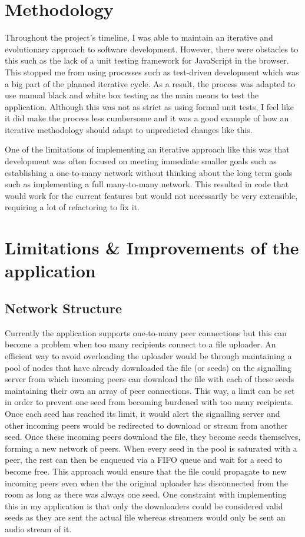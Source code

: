 \documentclass[]{report}
\begin{document}
		\section{Methodology}
		Throughout the project's timeline, I was able to maintain an iterative and evolutionary approach to software development. However, there were obstacles to this such as the lack of a unit testing framework for JavaScript in the browser. This stopped me from using processes such as test-driven development which was a big part of the planned iterative cycle. As a result, the process was adapted to use manual black and white box testing as the main means to test the application. Although this was not as strict as using formal unit tests, I feel like it did make the process less cumbersome and it was a good example of how an iterative methodology should adapt to unpredicted changes like this.
		
		One of the limitations of implementing an iterative approach like this was that development was often focused on meeting immediate smaller goals such as establishing a one-to-many network without thinking about the long term goals such as implementing a full many-to-many network. This resulted in code that would work for the current features but would not necessarily be very extensible, requiring a lot of refactoring to fix it.
	
		\section{Limitations \& Improvements of the application}
			\subsection{Network Structure}
			Currently the application supports one-to-many peer connections but this can become a problem when too many recipients connect to a file uploader. An efficient way to avoid overloading the uploader would be through maintaining a pool of nodes that have already downloaded the file (or seeds) on the signalling server from which incoming peers can download the file with each of these seeds maintaining their own an array of peer connections. This way, a limit can be set in order to prevent one seed from becoming burdened with too many recipients. Once each seed has reached its limit, it would alert the signalling server and other incoming peers would be redirected to download or stream from another seed. Once these incoming peers download the file, they become seeds themselves, forming a new network of peers. When every seed in the pool is saturated with a peer, the rest can then be enqueued via a FIFO queue and wait for a seed to become free. This approach would ensure that the file could propagate to new incoming peers even when the the original uploader has disconnected from the room as long as there was always one seed. One constraint with implementing this in my application is that only the downloaders could be considered valid seeds as they are sent the actual file whereas streamers would only be sent an audio stream of it.
			
\end{document}
